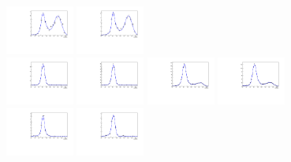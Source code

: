 \begin{figure}[htbp]
  \includegraphics[width=0.2\textwidth]{fig/2Dfit/LNuJJ_res_MJJ_mu_LP_bb_HDy.pdf}
  \includegraphics[width=0.2\textwidth]{fig/2Dfit/LNuJJ_res_MJJ_e_LP_bb_HDy.pdf}\\
  \includegraphics[width=0.2\textwidth]{fig/2Dfit/LNuJJ_res_MJJ_mu_HP_nobb_HDy.pdf}
  \includegraphics[width=0.2\textwidth]{fig/2Dfit/LNuJJ_res_MJJ_e_HP_nobb_HDy.pdf}
  \includegraphics[width=0.2\textwidth]{fig/2Dfit/LNuJJ_res_MJJ_mu_LP_nobb_HDy.pdf}
  \includegraphics[width=0.2\textwidth]{fig/2Dfit/LNuJJ_res_MJJ_e_LP_nobb_HDy.pdf}\\
  \includegraphics[width=0.2\textwidth]{fig/2Dfit/LNuJJ_res_MJJ_mu_HP_vbf_HDy.pdf}
  \includegraphics[width=0.2\textwidth]{fig/2Dfit/LNuJJ_res_MJJ_e_HP_vbf_HDy.pdf}

\end{figure}
